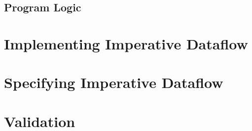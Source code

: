 \documentclass[svgnames]{beamer}
\begin{document}
\subsection{Program Logic}

\section{Implementing Imperative Dataflow}
\section{Specifying Imperative Dataflow}
\section{Validation}
\end{document}
